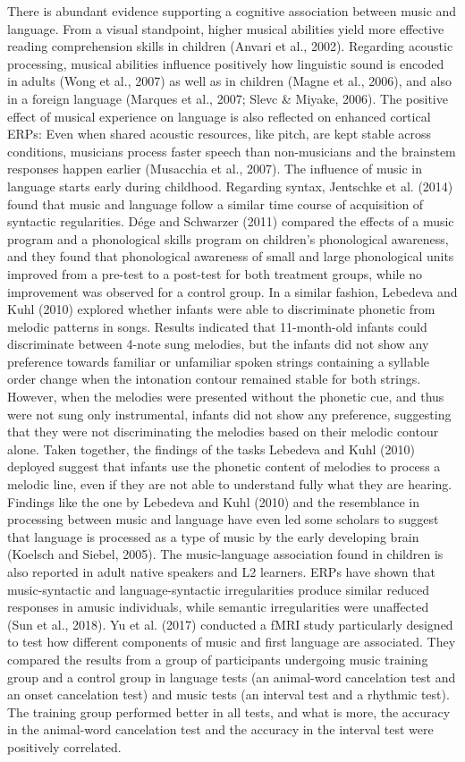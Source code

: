 \documentclass[english,man]{apa6}
\begin{document}
There is abundant evidence supporting a cognitive association between music and language. From a visual standpoint, higher musical abilities yield more effective reading comprehension skills in children (Anvari et al., 2002). Regarding acoustic processing, musical abilities influence positively how linguistic sound is encoded in adults (Wong et al., 2007) as well as in children (Magne et al., 2006), and also in a foreign language (Marques et al., 2007; Slevc \& Miyake, 2006). The positive effect of musical experience on language is also reflected on enhanced cortical ERPs: Even when shared acoustic resources, like pitch, are kept stable across conditions, musicians process faster speech than non-musicians and the brainstem responses happen earlier (Musacchia et al., 2007).
The influence of music in language starts early during childhood. Regarding syntax, Jentschke et al. (2014) found that music and language follow a similar time course of acquisition of syntactic regularities. Dége and Schwarzer (2011) compared the effects of a music program and a phonological skills program on children's phonological awareness, and they found that phonological awareness of small and large phonological units improved from a pre-test to a post-test for both treatment groups, while no improvement was observed for a control group. In a similar fashion, Lebedeva and Kuhl (2010) explored whether infants were able to discriminate phonetic from melodic patterns in songs. Results indicated that 11-month-old infants could discriminate between 4-note sung melodies, but the infants did not show any preference towards familiar or unfamiliar spoken strings containing a syllable order change when the intonation contour remained stable for both strings. However, when the melodies were presented without the phonetic cue, and thus were not sung only instrumental, infants did not show any preference, suggesting that they were not discriminating the melodies based on their melodic contour alone. Taken together, the findings of the tasks Lebedeva and Kuhl (2010) deployed suggest that infants use the phonetic content of melodies to process a melodic line, even if they are not able to understand fully what they are hearing. Findings like the one by Lebedeva and Kuhl (2010) and the resemblance in processing between music and language have even led some scholars to suggest that language is processed as a type of music by the early developing brain (Koelsch and Siebel, 2005).
The music-language association found in children is also reported in adult native speakers and L2 learners. ERPs have shown that music-syntactic and language-syntactic irregularities produce similar reduced responses in amusic individuals, while semantic irregularities were unaffected (Sun et al., 2018). Yu et al. (2017) conducted a fMRI study particularly designed to test how different components of music and first language are associated. They compared the results from a group of participants undergoing music training group and a control group in language tests (an animal-word cancelation test and an onset cancelation test) and music tests (an interval test and a rhythmic test). The training group performed better in all tests, and what is more, the accuracy in the animal-word cancelation test and the accuracy in the interval test were positively correlated.
\end{document}
